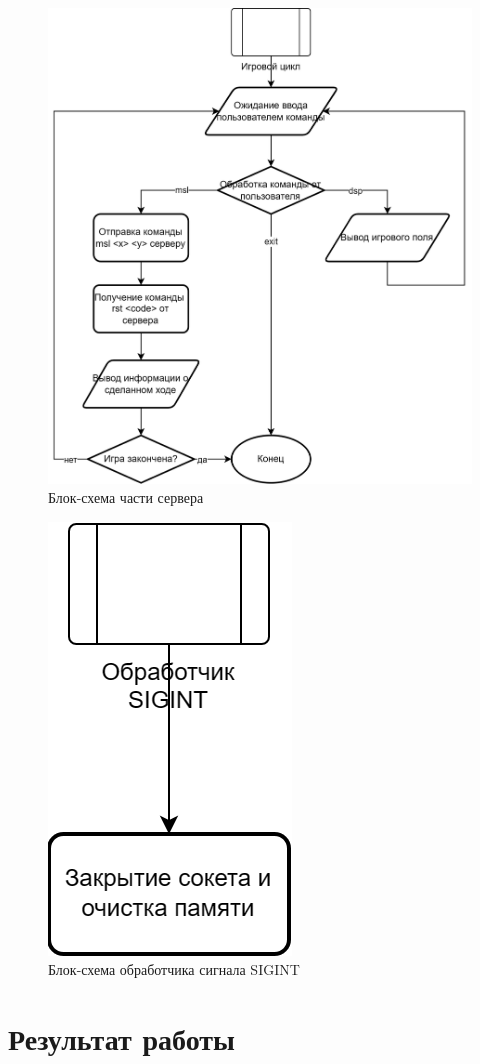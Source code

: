 \begin{figure}[H]
    \centering
    \includegraphics[width=0.85\linewidth]{images/lab3_flowchart_server.drawio.png}
    \caption{Блок-схема части сервера}
    \label{fig:server_flowchart}
\end{figure}

\begin{figure}[H]
    \centering
    \includegraphics[width=0.2\linewidth]{images/lab3_flowchart_cont2.drawio.png}
    \caption{Блок-схема обработчика сигнала SIGINT}
    \label{fig:flowchart_sigint}
\end{figure}

\newpage

\section*{Результат работы}


